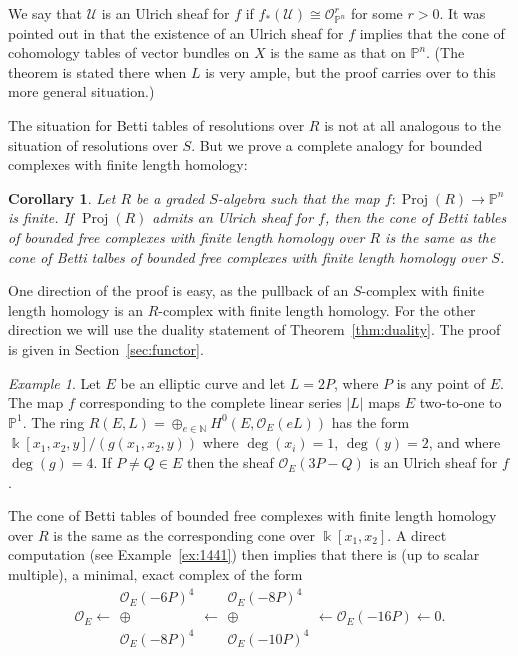 \documentclass[12pt]{amsart}
\newtheorem{cor}[lemma]{Corollary}
\theoremstyle{definition}
\theoremstyle{remark}
\newtheorem{example}[lemma]{Example}
\newcommand{\Proj}{\operatorname{Proj}}
\newcommand{\kk}{\Bbbk}
\newcommand{\PP}{\mathbb{P}}
\newcommand{\NN}{\mathbb{N}}
\newcommand{\cO}{\mathcal{O}}
\newcommand{\cU}{\mathcal{U}}
\newcommand{\defi}[1]{\textsf{#1}} %
\renewcommand{\P}{{\mathbb P}}
\begin{document}
%

We say that $\cU$ is an \defi{Ulrich sheaf} for $f$ if $f_*(\cU)\cong \cO_{\PP^n}^r$ for some $r>0$.  It was pointed out in \cite[Theorem~5]{eis-schrey-abel} that the existence of an Ulrich sheaf for $f$ implies that  the cone of cohomology tables of vector bundles on $X$ is the same as that on $\PP^{n}$. (The theorem is stated there when $L$ is very ample, but the proof
carries over to this more general situation.) 

The situation for Betti tables of resolutions over $R$ is not at all analogous to the situation of resolutions over $S$. But we prove a complete analogy for bounded complexes with finite length homology:

\begin{cor}\label{cor:isom cones}
Let $R$ be a graded $S$-algebra such that the map $f\colon \Proj(R)\to \P^{n}$ is finite.  If $\Proj(R)$ admits an Ulrich sheaf for $f$, then the cone of Betti tables
of bounded free complexes with finite length homology over  $R$ is the same
as the cone of Betti talbes of bounded free complexes with finite length homology over $S$. 
\end{cor}

One direction of the proof is easy, as the pullback of an $S$-complex with finite length homology is an $R$-complex with finite length homology.  For the other direction we will use the duality statement of Theorem~\ref{thm:duality}. The proof is given in Section~\ref{sec:functor}.

\begin{example}\label{ex:elliptic}
Let $E$ be an elliptic curve and let $L=2P$, where $P$ is any point of $E$.  The map $f$ corresponding to the complete
linear series $|L|$ maps $E$ two-to-one to $\P^{1}$. The ring $R(E,L)=\oplus_{e\in \NN} H^0(E,\cO_E(eL))$ has the form
$\kk[x_1,x_2,y]/(g(x_{1},x_{2},y))$  where $\deg(x_i)=1$, $\deg(y)=2$, and where $\deg(g)=4$.
If $P\neq Q\in E$ then the sheaf $\cO_E(3P-Q)$ is an Ulrich sheaf for $f$. 

The cone of
Betti tables of bounded free complexes with finite length homology over $R$ is the same
as the corresponding cone over $\kk[x_1,x_2]$.  A direct computation (see Example~\ref{ex:1441}) then implies that there is (up to scalar multiple), a minimal, exact complex of the form
\[
\cO_E\longleftarrow \begin{matrix}  \cO_E(-6P)^4\\ \oplus\\ \cO_E(-8P)^4\end{matrix}\longleftarrow \begin{matrix}  \cO_E(-8P)^4\\ \oplus\\ \cO_E(-10P)^4\end{matrix} \longleftarrow \cO_E(-16P)\longleftarrow 0.
\]
\end{example}
\end{document}
